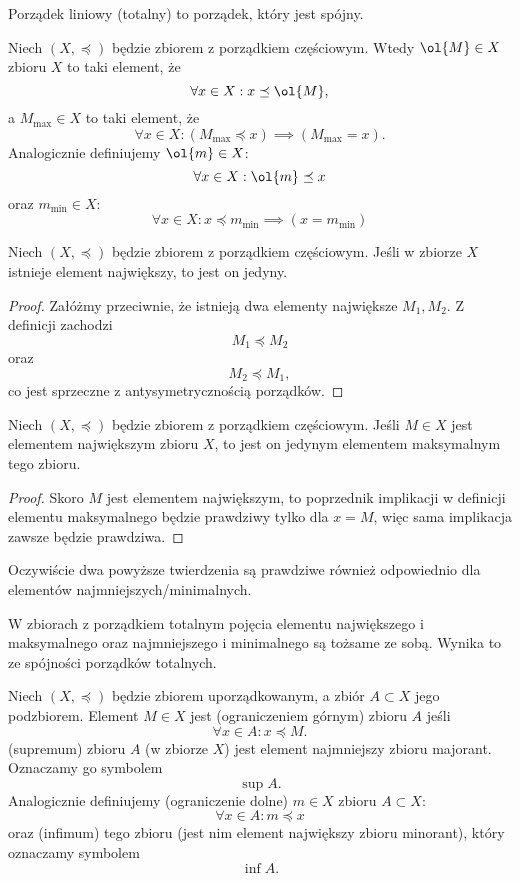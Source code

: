 \begin{definition}
    Porządek liniowy (totalny) to porządek, który jest spójny.
\end{definition}

Niech $(X, \preceq)$ będzie zbiorem z porządkiem częściowym. Wtedy  $\ol{M} \in X$ zbioru $X$ to taki element, że
$$ \forall x \in X : x \preceq \ol{M}, $$
a  $M_{\max} \in X$ to taki element, że
$$ \forall x \in X : (M_{\max} \preceq x) \implies (M_{\max} = x). $$
Analogicznie definiujemy  $\ol{m} \in X$:
$$ \forall x \in X : \ol{m} \preceq x $$
oraz  $m_{\min} \in X$:
$$ \forall x \in X : x \preceq m_{\min} \implies (x = m_{\min}) $$

\begin{theorem}
    \label{t:uniq_greatest}
    Niech $(X, \preceq)$ będzie zbiorem z porządkiem częściowym. Jeśli w zbiorze $X$ istnieje element największy, to jest on jedyny.
\end{theorem}
\begin{proof}
    Załóżmy przeciwnie, że istnieją dwa elementy największe $M_1, M_2$. Z definicji zachodzi
    $$ M_1 \preceq M_2 $$
    oraz
    $$ M_2 \preceq M_1, $$
    co jest sprzeczne z antysymetrycznością porządków.
\end{proof}

\begin{theorem}
    Niech $(X, \preceq)$ będzie zbiorem z porządkiem częściowym. Jeśli $M \in X$ jest elementem największym zbioru $X$, to jest on jedynym elementem maksymalnym tego zbioru.
\end{theorem}
\begin{proof}
    Skoro $M$ jest elementem największym, to poprzednik implikacji w definicji elementu maksymalnego będzie prawdziwy tylko dla $x = M$, więc sama implikacja zawsze będzie prawdziwa.
\end{proof}

Oczywiście dwa powyższe twierdzenia są prawdziwe również odpowiednio dla elementów najmniejszych/minimalnych.

\begin{fact}
    \label{f:greatest=maximal}
    W zbiorach z porządkiem totalnym pojęcia elementu największego i maksymalnego oraz najmniejszego i minimalnego są tożsame ze sobą. Wynika to ze spójności porządków totalnych.
\end{fact}

Niech $(X, \preceq)$ będzie zbiorem uporządkowanym, a zbiór $A \subset X$ jego podzbiorem. Element $M \in X$ jest  (ograniczeniem górnym) zbioru $A$ jeśli
$$ \forall x \in A : x \preceq M. $$
 (supremum) zbioru $A$ (w zbiorze $X$) jest element najmniejszy zbioru majorant. Oznaczamy go symbolem
$$\sup A.$$
Analogicznie definiujemy  (ograniczenie dolne) $m \in X$ zbioru $A \subset X$:
$$ \forall x \in A : m \preceq x $$
oraz  (infimum) tego zbioru (jest nim element największy zbioru minorant), który oznaczamy symbolem
$$\inf A.$$

